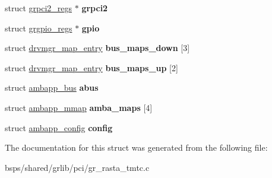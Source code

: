 \begin{DoxyCompactItemize}
\item 
\mbox{\label{structgr__rasta__tmtc__priv_aa381be87e8a0bb3c20be3f84d5bf478c}} 
struct \mbox{\hyperlink{structgrpci2__regs}{grpci2\+\_\+regs}} $\ast$ {\bfseries grpci2}
\item 
\mbox{\label{structgr__rasta__tmtc__priv_a42bdeffaa605095fb3871cc40c3a9b64}} 
struct \mbox{\hyperlink{structgrgpio__regs}{grgpio\+\_\+regs}} $\ast$ {\bfseries gpio}
\item 
\mbox{\label{structgr__rasta__tmtc__priv_a843c0a3bbc3afe9ef4a43a3360c281e5}} 
struct \mbox{\hyperlink{structdrvmgr__map__entry}{drvmgr\+\_\+map\+\_\+entry}} {\bfseries bus\+\_\+maps\+\_\+down} \mbox{[}3\mbox{]}
\item 
\mbox{\label{structgr__rasta__tmtc__priv_a62d9c716a78eb58fc2fba29b986ba664}} 
struct \mbox{\hyperlink{structdrvmgr__map__entry}{drvmgr\+\_\+map\+\_\+entry}} {\bfseries bus\+\_\+maps\+\_\+up} \mbox{[}2\mbox{]}
\item 
\mbox{\label{structgr__rasta__tmtc__priv_af844a02bc16912edc0994ac28803162a}} 
struct \mbox{\hyperlink{structambapp__bus}{ambapp\+\_\+bus}} {\bfseries abus}
\item 
\mbox{\label{structgr__rasta__tmtc__priv_ab05c9789aab781d78d352167fbcac2ae}} 
struct \mbox{\hyperlink{structambapp__mmap}{ambapp\+\_\+mmap}} {\bfseries amba\+\_\+maps} \mbox{[}4\mbox{]}
\item 
\mbox{\label{structgr__rasta__tmtc__priv_a85a16bb9355455e793132a5b3873c190}} 
struct \mbox{\hyperlink{structambapp__config}{ambapp\+\_\+config}} {\bfseries config}
\end{DoxyCompactItemize}


The documentation for this struct was generated from the following file\+:\begin{DoxyCompactItemize}
\item 
bsps/shared/grlib/pci/gr\+\_\+rasta\+\_\+tmtc.\+c\end{DoxyCompactItemize}
